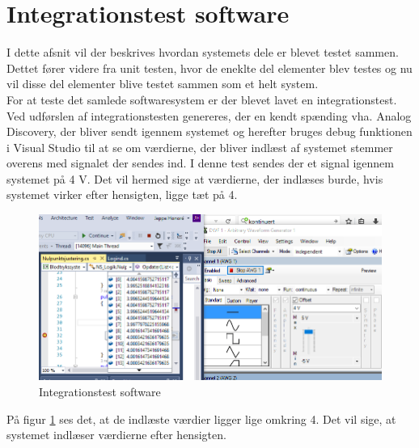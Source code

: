 \section{Integrationstest software}
I dette afsnit vil der beskrives hvordan systemets dele er blevet testet sammen. Dettet fører videre fra unit testen, hvor de eneklte del elementer blev testes og nu vil disse del elementer blive testet sammen som et helt system. \\
For at teste det samlede softwaresystem er der blevet lavet en integrationstest. Ved udførslen af integrationstesten genereres, der en kendt spænding vha. Analog Discovery, der bliver sendt igennem systemet og herefter bruges debug funktionen i Visual Studio til at se om værdierne, der bliver indlæst af systemet stemmer overens med signalet der sendes ind.
I denne test sendes der et signal igennem systemet på 4 V. Det vil hermed sige at værdierne, der indlæses burde, hvis systemet virker efter hensigten, ligge tæt på 4.
\begin{figure}[H]
	\centering
	\includegraphics[width=1\textwidth]{Figurer/Softwareimplementering/Integrationstest}
	\caption{Integrationstest software}
	\label{fig:integrationstestsoftware}
\end{figure}
På figur \ref{fig:integrationstestsoftware} ses det, at de indlæste værdier ligger lige omkring 4. Det vil sige, at systemet indlæser værdierne efter hensigten.   

